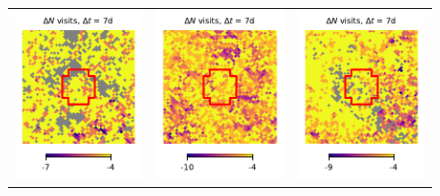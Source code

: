 \documentclass[preprintm,linenumbers]{aastex631}
\begin{document}
\begin{figure}
\begin{tabular}{  c c c}
				\includegraphics{results/skymaps_cutout/skymaps_cutout_delta_first_year_one_snap_v4_0_10yrs_db_noDD_noTwi_tscale-7_nside-256_doAllTemplateMetrics_reduceCount_r_NES_noDD_noTwi.pdf} &
				\includegraphics{results/skymaps_cutout/skymaps_cutout_delta_first_year_one_snap_v4_0_10yrs_db_noDD_noTwi_tscale-7_nside-256_doAllTemplateMetrics_reduceCount_r_WFD_noDD_noTwi.pdf} &
				\includegraphics{results/skymaps_cutout/skymaps_cutout_delta_first_year_one_snap_v4_0_10yrs_db_noDD_noTwi_tscale-7_nside-256_doAllTemplateMetrics_reduceCount_r_GP_noDD_noTwi.pdf} \\

\end{tabular}
\end{figure}
\end{document}

